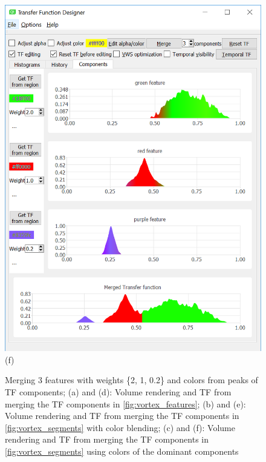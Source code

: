 \documentclass[twoside,twocolumn,10pt]{article}
\begin{document}
\begin{figure}
\begin{minipage}{.33\textwidth}
		\includegraphics[width=1\linewidth]{tf_vortex_merged_segment_green_red_purple}
		(f)
	\end{minipage}
	\caption{Merging 3 features with weights \{2, 1, 0.2\} and colors from peaks of TF components; (a) and (d): Volume rendering and TF from merging the TF components in \autoref{fig:vortex_features}; (b) and (e): Volume rendering and TF from merging the TF components in \autoref{fig:vortex_segments} with color blending; (c) and (f): Volume rendering and TF from merging the TF components in \autoref{fig:vortex_segments} using colors of the dominant components}
	\label{fig:vortex_merged}
\end{figure}
\end{document}
